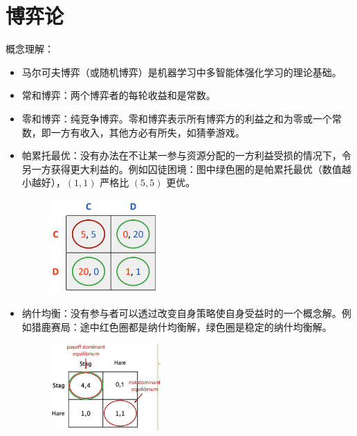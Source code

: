 \section{博弈论}
\begin{remark}
    概念理解：
    \begin{itemize}
        \item 马尔可夫博弈（或随机博弈）是机器学习中多智能体强化学习的理论基础。
        \item 常和博弈：两个博弈者的每轮收益和是常数。
        \item 零和博弈：纯竞争博弈。零和博弈表示所有博弈方的利益之和为零或一个常数，即一方有收入，其他方必有所失，如猜拳游戏。
        \item 帕累托最优：没有办法在不让某一参与资源分配的一方利益受损的情况下，令另一方获得更大利益的。例如囚徒困境：图中绿色圈的是帕累托最优（数值越小越好），$(1, 1)$ 严格比 $(5, 5)$ 更优。
        \begin{figure}[htbp]
            \centering
            \includegraphics[width=0.4\textwidth]{./figure/fig5.png}
        \end{figure}
        \item 纳什均衡：没有参与者可以透过改变自身策略使自身受益时的一个概念解。例如猎鹿赛局：途中红色圈都是纳什均衡解，绿色圈是稳定的纳什均衡解。
        \begin{figure}[htbp]
            \centering
            \includegraphics[width=0.4\textwidth]{./figure/fig6.png}
        \end{figure}
    \end{itemize}
\end{remark}

